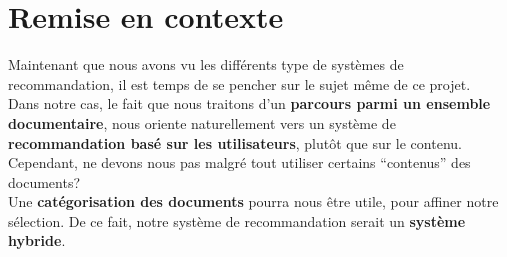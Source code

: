 \chapter{Remise en contexte}
    Maintenant que nous avons vu les différents type de systèmes de recommandation, il est temps de se pencher sur le sujet même de ce projet.\\

    Dans notre cas, le fait que nous traitons d'un \textbf{parcours parmi un ensemble documentaire}, nous oriente naturellement vers un système de \textbf{recommandation basé sur les utilisateurs}, plutôt que sur le contenu.\\
    Cependant, ne devons nous pas malgré tout utiliser certains ``contenus'' des documents?\\

    Une \textbf{catégorisation des documents} pourra nous être utile, pour affiner notre sélection. De ce fait, notre système de recommandation serait un \textbf{système hybride}.
